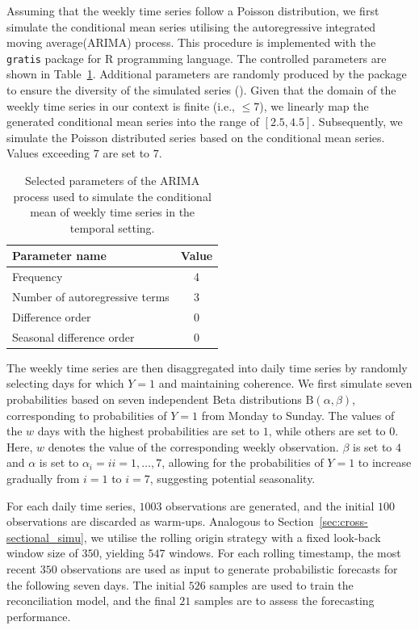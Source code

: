 \documentclass[a4paper,review,12pt,authoryear]{elsarticle}
\let\code=\texttt
\let\proglang=\textsf
\begin{document}
     Assuming that the weekly time series follow a Poisson distribution, we first simulate the conditional mean series utilising the autoregressive integrated moving average(ARIMA)  process. This procedure is implemented with the \code{gratis} package for \proglang{R} programming language. 
     The controlled parameters are shown in Table~\ref{tab:parameters}. Additional parameters are randomly produced by the package to ensure the diversity of the simulated series (). 
     Given that the domain of the weekly time series in our context is finite (i.e., $\leq 7$), we linearly map the generated conditional mean series into the range of $[2.5, 4.5]$. 
     Subsequently, we simulate the Poisson distributed series based on the conditional mean series. Values exceeding $7$ are set to $7$.
     
     \begin{table}[h]
       \centering
       \caption{\label{tab:parameters} Selected parameters of the ARIMA process used to simulate the conditional mean of weekly time series in the temporal setting.}
       \begin{tabular}{lc}
         \toprule
         Parameter name & Value \\ \midrule
         Frequency & 4 \\
         Number of autoregressive terms & 3 \\
         Difference order & 0 \\
         Seasonal difference order & 0 \\ \bottomrule
       \end{tabular}
     \end{table}
     
     The weekly time series are then disaggregated into daily time series by randomly selecting days for which $Y=1$ and maintaining coherence. 
     We first simulate seven probabilities based on seven independent Beta distributions $\textrm{B}(\alpha, \beta)$, corresponding to probabilities of $Y=1$ from Monday to Sunday. 
     The values of the $w$ days with the highest probabilities are set to $1$, while others are set to $0$. Here, $w$ denotes the value of the corresponding weekly observation.
     $\beta$ is set to $4$ and $\alpha$ is set to $\alpha_i = i i=1,\dots,7$, allowing for the probabilities of $Y=1$ to increase gradually from $i=1$ to $i=7$, suggesting potential seasonality.
     
     For each daily time series, $1003$ observations are generated, and the initial $100$ observations are discarded as warm-ups. Analogous to Section~\ref{sec:cross-sectional_simu}, we utilise the rolling origin strategy with a fixed look-back window size of $350$, yielding $547$ windows.
     For each rolling timestamp, the most recent $350$ observations are used as input to generate probabilistic forecasts for the following seven days. 
     The initial $526$ samples are used to train the reconciliation model, and the final $21$ samples are to assess the forecasting performance.
     
\end{document}
